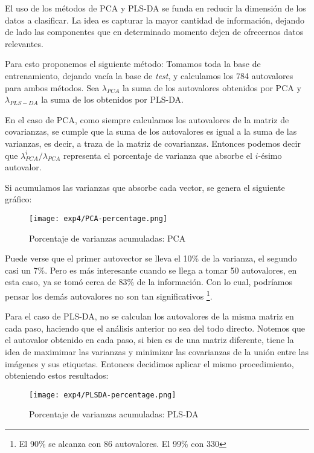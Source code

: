 El uso de los m\'etodos de PCA y PLS-DA se funda en reducir la dimensi\'on de los datos a clasificar. La idea es capturar la mayor cantidad de informaci\'on, dejando de lado las componentes que en determinado momento dejen de ofrecernos datos relevantes.

Para esto proponemos el siguiente m\'etodo: Tomamos toda la base de entrenamiento, dejando vac\'ia la base de \textit{test}, y calculamos los 784 autovalores para ambos m\'etodos. Sea $\lambda_{PCA}$ la suma de los autovalores obtenidos por PCA y $\lambda_{PLS-DA}$ la suma de los obtenidos por PLS-DA.

En el caso de PCA, como siempre calculamos los autovalores de la matriz de covarianzas, se cumple que la suma de los autovalores es igual a la suma de las varianzas, es decir, a traza de la matriz de covarianzas. Entonces podemos decir que $\lambda_{PCA}^{i} / \lambda_{PCA}$ representa el porcentaje de varianza que absorbe el $i$-\'esimo autovalor.

Si acumulamos las varianzas que absorbe cada vector, se genera el siguiente gr\'afico:

\begin{figure}[h!]
  \begin{center}
	\texttt{[image: exp4/PCA-percentage.png]}
	\caption{Porcentaje de varianzas acumuladas: PCA}
	\label{accum_var_PCA}
  \end{center}
\end{figure}

Puede verse que el primer autovector se lleva el 10\% de la varianza, el segundo casi un 7\%. Pero es m\'as interesante cuando se llega a tomar 50 autovalores, en esta caso, ya se tom\'o cerca de 83\% de la informaci\'on. Con lo cual, podr\'iamos pensar los dem\'as autovalores no son tan significativos \footnote{El 90\% se alcanza con 86 autovalores. El 99\% con 330}.

Para el caso de PLS-DA, no se calculan los autovalores de la misma matriz en cada paso, haciendo que el an\'alisis anterior no sea del todo directo. Notemos que el autovalor obtenido en cada paso, si bien es de una matriz diferente, tiene la idea de maximimar las varianzas y minimizar las covarianzas de la uni\'on entre las im\'agenes y sus etiquetas. Entonces decidimos aplicar el mismo procedimiento, obteniendo estos resultados:

\newpage

\begin{figure}[h!]
  \begin{center}
	\texttt{[image: exp4/PLSDA-percentage.png]}
	\caption{Porcentaje de varianzas acumuladas: PLS-DA}
	\label{accum_var_PLSDA}
  \end{center}
\end{figure}

